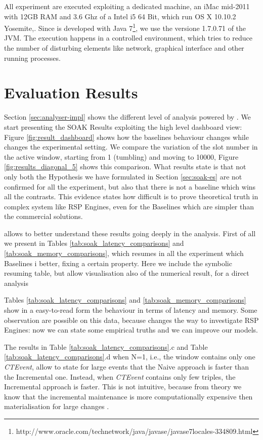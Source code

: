 All experiment are executed exploiting a dedicated machine, an iMac mid-2011 with 12GB RAM and 3.6 Ghz of a Intel i5 64 Bit, which run OS X 10.10.2 Yosemite,. Since \name is developed with Java 7\footnote{http://www.oracle.com/technetwork/java/javase/javase7locales-334809.html}, we use the versione 1.7.0.71 of the JVM.
The execution happens in a controlled environment, which tries to reduce the number of disturbing elements like network, graphical interface and other running processes.

\section{Evaluation Results}



Section \ref{sec:analyser-impl} shows the different level of analysis powered by \namens. We start presenting the SOAK Results exploiting the high level dashboard view: Figure \ref{fig:result_dashboard} shows how the baselines behaviour changes while changes the experimental setting. We compare the variation of the slot number in the active window, starting from 1 (tumbling) and moving to 10000, Figure \ref{fig:results_diagonal_5} shows this comparison.
What results state is that not only both the Hypothesis we have formulated in Section \ref{sec:soak-es} are not confirmed for all the experiment, but also that there is not a baseline which wins all the contrasts. This evidence states how difficult is to prove theoretical truth in complex system like RSP Engines, even for the Baselines which are simpler than the commercial solutions.

\name allows to better understand these results going deeply in the analysis. First of all we present in Tables \ref{tab:soak_latency_comparisons} and \ref{tab:soak_memory_comparisons}, which resumes in all the experiment which Baselines i better, fixing a certain property. Here we include the symbolic resuming table, but \name allow visualisation also of the numerical result, for a direct analysis

Tables \ref{tab:soak_latency_comparisons}  and \ref{tab:soak_memory_comparisons} show in a easy-to-read form the behaviour in terms of latency and memory. Some observation are possible on this data, because \name changes the way to investigate RSP Engines: now we can state some empirical truths and we can improve our models. 

The results in Table \ref{tab:soak_latency_comparisons}.c and Table \ref{tab:soak_latency_comparisons}.d when N=1, i.e., the window contains only one \textit{CTEvent},  allow to state for large events that the Naive approach is faster than the Incremental one. Instead, when \textit{CTEvent} contains only few triples, the Incremental approach is faster. This is not intuitive, because from theory we know that the incremental maintenance is more computationally expensive then materialisation for large changes \cite{DellAglio2014,DBLP:conf/cikm/RenP11,DBLP:conf/semweb/UrbaniMJHB13}.

